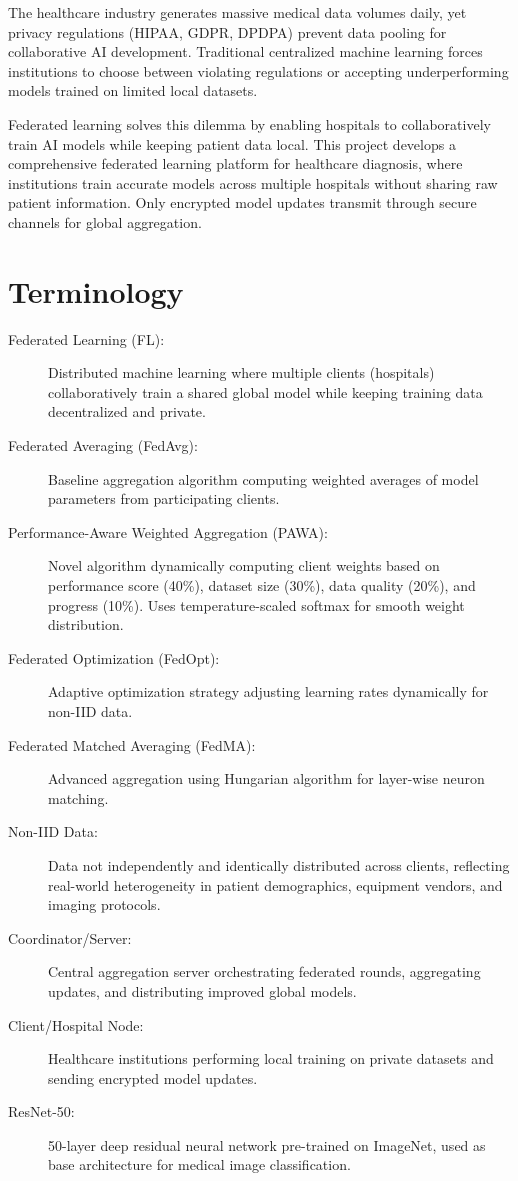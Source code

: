 The healthcare industry generates massive medical data volumes daily, yet privacy regulations (HIPAA, GDPR, DPDPA) prevent data pooling for collaborative AI development. Traditional centralized machine learning forces institutions to choose between violating regulations or accepting underperforming models trained on limited local datasets.

Federated learning solves this dilemma by enabling hospitals to collaboratively train AI models while keeping patient data local. This project develops a comprehensive federated learning platform for healthcare diagnosis, where institutions train accurate models across multiple hospitals without sharing raw patient information. Only encrypted model updates transmit through secure channels for global aggregation.

\section{Terminology}

\begin{description}
    \item[Federated Learning (FL):] Distributed machine learning where multiple clients (hospitals) collaboratively train a shared global model while keeping training data decentralized and private.
    \item[Federated Averaging (FedAvg):] Baseline aggregation algorithm computing weighted averages of model parameters from participating clients.
    \item[Performance-Aware Weighted Aggregation (PAWA):] Novel algorithm dynamically computing client weights based on performance score (40\%), dataset size (30\%), data quality (20\%), and progress (10\%). Uses temperature-scaled softmax for smooth weight distribution.
    \item[Federated Optimization (FedOpt):] Adaptive optimization strategy adjusting learning rates dynamically for non-IID data.
    \item[Federated Matched Averaging (FedMA):] Advanced aggregation using Hungarian algorithm for layer-wise neuron matching.
    \item[Non-IID Data:] Data not independently and identically distributed across clients, reflecting real-world heterogeneity in patient demographics, equipment vendors, and imaging protocols.
    \item[Coordinator/Server:] Central aggregation server orchestrating federated rounds, aggregating updates, and distributing improved global models.
    \item[Client/Hospital Node:] Healthcare institutions performing local training on private datasets and sending encrypted model updates.
    \item[ResNet-50:] 50-layer deep residual neural network pre-trained on ImageNet, used as base architecture for medical image classification.
\end{description}

